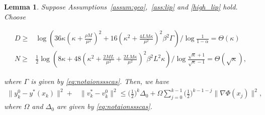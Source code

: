 \documentclass{osudissert96}
\newtheorem{lemma}{Lemma}
\begin{document}
\begin{lemma}\label{le:bibibiss}
Suppose Assumptions~\ref{assum:geo},~\ref{ass:lip} and \ref{high_lip} hold. Choose
\begin{small}
\begin{align}\label{eq:findbogas}
D\geq& \log{(36 \kappa (\kappa +\frac{\rho M}{\mu^2} )^2+16(\kappa^2+\frac{4LM\kappa}{\mu^2})^2\beta^2\Gamma)}/\log\frac{1}{1-\alpha}=\Theta(\kappa)  \nonumber
\\ N\geq& \frac{1}{2}\log(8\kappa+48(\kappa^2+\frac{2ML}{\mu^2}+\frac{2LM\kappa}{\mu^2})^2\beta^2L^2 \kappa ) /\log \frac{\sqrt{\kappa}+1}{\sqrt{\kappa}-1} = \Theta(\sqrt{\kappa}),
 \end{align}
 \end{small}
\hspace{-0.12cm}where $\Gamma$ is given by \cref{eq:notaionssscas}.   Then, we have 
\begin{align}
\|y^0_k-y^*(x_k)\|^2 + &\|v_k^*-v_k^0\|^2   \leq \Big(\frac{1}{2}\Big)^k  \Delta_0+\Omega\sum_{j=0}^{k-1}\Big(\frac{1}{2}\Big)^{k-1-j}\|\nabla \Phi(x_{j})\|^2,
\end{align}
where $\Omega$ and $\Delta_0$ are given by \cref{eq:notaionssscas}. 
\end{lemma}
\end{document}
